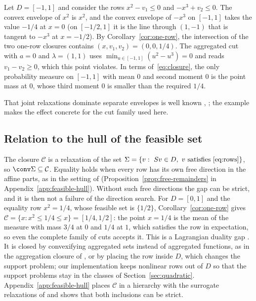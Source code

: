 \begin{example}\label{ex:two-rows}
Let $D=[-1,1]$ and consider the rows $x^2-v_1\le0$ and $-x^3+v_2\le0$. The
convex envelope of $x^2$ is $x^2$, and the convex envelope of $-x^3$ on
$[-1,1]$ takes the value $-1/4$ at $x=0$ (on $[-1/2,1]$ it is the line through
$(1,-1)$ that is tangent to $-x^3$ at $x=-1/2$). By
Corollary~\ref{cor:one-row}, the intersection of the two one-row closures
contains $(x,v_1,v_2)=(0,0,1/4)$. The aggregated cut with $a=0$ and
$\lambda=(1,1)$ uses $\min_{u\in[-1,1]}(u^2-u^3)=0$ and reads $v_1-v_2\ge0$,
which this point violates. In terms of~\eqref{eq:closure}, the only
probability measure on $[-1,1]$ with mean $0$ and second moment $0$ is the
point mass at $0$, whose third moment $0$ is smaller than the required $1/4$.
\end{example}

That joint relaxations dominate separate envelopes is well known
\citep[Lemma~3.4]{Nowak2005}, \citep{Tawarmalani2010,LiersEtAl2021}; the
example makes the effect concrete for the cut family used here.

\subsection{Relation to the hull of the feasible set}\label{sec:feasible-hull}

The closure $\mathcal C$ is a relaxation of the set
$\Sigma=\{v:\ Sv\in D,\ v\text{ satisfies~\eqref{eq:rows}}\}$, so
$\conv\Sigma\subseteq\mathcal C$. Equality holds when every row has its own free
direction in the affine parts, as in the setting of \citet{LiersEtAl2021}
(Proposition~\ref{prop:free-remainders} in Appendix~\ref{app:feasible-hull}).
Without such free directions the gap can be strict, and it is then not a
failure of the direction search. For $D=[0,1]$ and the equality row $x^2=1/4$,
whose feasible set is $\{1/2\}$, Corollary~\ref{cor:one-row} gives
$\mathcal C=\{x:x^2\le1/4\le x\}=[1/4,1/2]$: the point $x=1/4$ is the mean of the
measure with mass $3/4$ at $0$ and $1/4$ at $1$, which satisfies the row in
expectation, so even the complete family of cuts accepts it. This is a
Lagrangian duality gap \citep{Geoffrion1974,Nowak2005}. It is closed by
convexifying aggregated sets instead of aggregated functions, as in the
aggregation closure of \citet{DeyMunozSerrano2022}, or by placing the row inside
$D$, which changes the support problem; our implementation keeps nonlinear rows
out of $D$ so that the support problems stay in the classes of
Section~\ref{sec:quadratic}. Appendix~\ref{app:feasible-hull} places
$\mathcal C$ in a hierarchy with the surrogate relaxations of
\citet{MullerEtAl2022} and shows that both inclusions can be strict.
